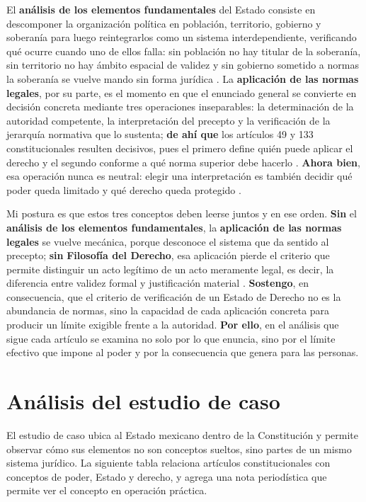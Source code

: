 \documentclass[
spanish,
letterpaper, oneside
]{article}
\begin{document}
	El \textbf{análisis de los elementos fundamentales} del Estado consiste en descomponer la organización política en población, territorio, gobierno y soberanía para luego reintegrarlos como un sistema interdependiente, verificando qué ocurre cuando uno de ellos falla: sin población no hay titular de la soberanía, sin territorio no hay ámbito espacial de validez y sin gobierno sometido a normas la soberanía se vuelve mando sin forma jurídica \citep{paredes2020}. La \textbf{aplicación de las normas legales}, por su parte, es el momento en que el enunciado general se convierte en decisión concreta mediante tres operaciones inseparables: la determinación de la autoridad competente, la interpretación del precepto y la verificación de la jerarquía normativa que lo sustenta; \textbf{de ahí que} los artículos 49 y 133 constitucionales resulten decisivos, pues el primero define quién puede aplicar el derecho y el segundo conforme a qué norma superior debe hacerlo \citep{cpeum2026,kelsen1982}. \textbf{Ahora bien}, esa operación nunca es neutral: elegir una interpretación es también decidir qué poder queda limitado y qué derecho queda protegido \citep{garcia2002}.
	
	Mi postura es que estos tres conceptos deben leerse juntos y en ese orden. \textbf{Sin} el \textbf{análisis de los elementos fundamentales}, la \textbf{aplicación de las normas legales} se vuelve mecánica, porque desconoce el sistema que da sentido al precepto; \textbf{sin} \textbf{Filosofía del Derecho}, esa aplicación pierde el criterio que permite distinguir un acto legítimo de un acto meramente legal, es decir, la diferencia entre validez formal y justificación material \citep{kelsen1982,ansutegui2007}. \textbf{Sostengo}, en consecuencia, que el criterio de verificación de un Estado de Derecho no es la abundancia de normas, sino la capacidad de cada aplicación concreta para producir un límite exigible frente a la autoridad. \textbf{Por ello}, en el análisis que sigue cada artículo se examina no solo por lo que enuncia, sino por el límite efectivo que impone al poder y por la consecuencia que genera para las personas.
	
	\section{Análisis del estudio de caso}
	
	El estudio de caso ubica al Estado mexicano dentro de la Constitución y permite observar cómo sus elementos no son conceptos sueltos, sino partes de un mismo sistema jurídico. La siguiente tabla relaciona artículos constitucionales con conceptos de poder, Estado y derecho, y agrega una nota periodística que permite ver el concepto en operación práctica.
	
\end{document}

